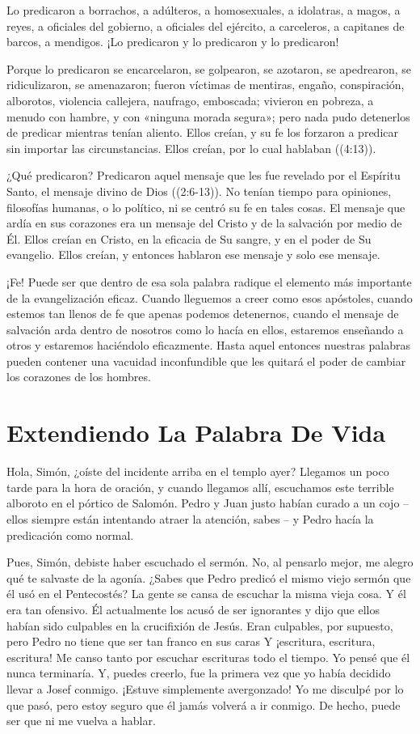 \documentclass[12pt, twoside, openright]{book}
\begin{document}
Lo predicaron a borrachos, a adúlteros, a homosexuales, a idolatras, a magos, a reyes, a oficiales del gobierno, a oficiales del ejército, a carceleros, a capitanes de barcos, a mendigos. ¡Lo predicaron y lo predicaron y lo predicaron!

Porque lo predicaron se encarcelaron, se golpearon, se azotaron, se apedrearon, se ridiculizaron, se amenazaron; fueron víctimas de mentiras, engaño, conspiración, alborotos, violencia callejera, naufrago, emboscada; vivieron en pobreza, a menudo con hambre, y con «ninguna morada segura»; pero nada pudo detenerlos de predicar mientras tenían aliento. Ellos creían, y su fe los forzaron a predicar sin importar las circunstancias. Ellos creían, por lo cual hablaban ((4:13)).

¿Qué predicaron? Predicaron aquel mensaje que les fue revelado por el Espíritu Santo, el mensaje divino de Dios ((2:6-13)). No tenían tiempo para opiniones, filosofías humanas, o lo político, ni se centró su fe en tales cosas. El mensaje que ardía en sus corazones era un mensaje del Cristo y de la salvación por medio de Él. Ellos creían en Cristo, en la eficacia de Su sangre, y en el poder de Su evangelio. Ellos creían, y entonces hablaron ese mensaje y solo ese mensaje.

¡Fe! Puede ser que dentro de esa sola palabra radique el elemento más importante de la evangelización eficaz. Cuando lleguemos a creer como esos apóstoles, cuando estemos tan llenos de fe que apenas podemos detenernos, cuando el mensaje de salvación arda dentro de nosotros como lo hacía en ellos, estaremos enseñando a otros y estaremos haciéndolo eficazmente. Hasta aquel entonces nuestras palabras pueden contener una vacuidad inconfundible que les quitará el poder de cambiar los corazones de los hombres. 

\section{Extendiendo La Palabra De Vida}
Hola, Simón, ¿oíste del incidente arriba en el templo ayer? Llegamos un poco tarde para la hora de oración, y cuando llegamos allí, escuchamos este terrible alboroto en el pórtico de Salomón. Pedro y Juan justo habían curado a un cojo – ellos siempre están intentando atraer la atención, sabes – y Pedro hacía la predicación como normal.

Pues, Simón, debiste haber escuchado el sermón. No, al pensarlo mejor, me alegro qué te salvaste de la agonía. ¿Sabes que Pedro predicó el mismo viejo sermón que él usó en el Pentecostés? La gente se cansa de escuchar la misma vieja cosa. Y él era tan ofensivo. Él actualmente los acusó de ser ignorantes y dijo que ellos habían sido culpables en la crucifixión de Jesús. Eran culpables, por supuesto, pero Pedro no tiene que ser tan franco en sus caras	Y ¡escritura, escritura, escritura! Me canso tanto por escuchar escrituras todo el tiempo. Yo pensé que él nunca terminaría. Y, puedes creerlo, fue la primera vez que yo había decidido llevar a Josef conmigo. ¡Estuve simplemente avergonzado! Yo me disculpé por lo que pasó, pero estoy seguro que él jamás volverá a ir conmigo. De hecho, puede ser que ni me vuelva a hablar. 
\end{document}
